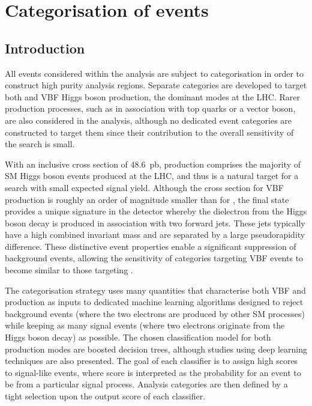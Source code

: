 \chapter{Categorisation of \Hee events}
\label{chap:eventCategorisation}

\section{Introduction}

All events considered within the \Hee analysis are subject to categorisation in order to construct high purity analysis regions. Separate categories are developed to target both \ggH and VBF Higgs boson production, the dominant modes at the LHC. Rarer production processes, such as in association with top quarks or a vector boson, are also considered in the analysis, although no dedicated event categories are constructed to target them since their contribution to the overall sensitivity of the search is small.

With an inclusive cross section of 48.6~pb, \ggH production comprises the majority of SM Higgs boson events produced at the LHC, and thus is a natural target for a search with small expected signal yield. Although the cross section for VBF production is roughly an order of magnitude smaller than for \ggH, the final state provides a unique signature in the detector whereby the dielectron from the Higgs boson decay is produced in association with two forward jets. These jets typically have a high combined invariant mass and are separated by a large pseudorapidity difference. These distinctive event properties enable a significant suppression of background events, allowing the sensitivity of categories targeting VBF events to become similar to those targeting \ggH. 

The categorisation strategy uses many quantities that characterise both VBF and \ggH production as inputs to dedicated machine learning algorithms designed to reject background events (where the two electrons are produced by other SM processes) while keeping as many signal events (where two electrons originate from the Higgs boson decay) as possible.
The chosen classification model for both production modes are boosted decision trees, although studies using deep learning techniques are also presented. The goal of each classifier is to assign high scores to signal-like events, where score is interpreted as the probability for an event to be from a particular signal process. Analysis categories are then defined by a tight selection upon the output score of each classifier.

